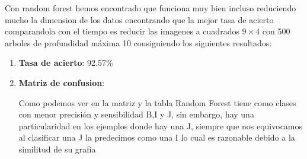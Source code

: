 \documentclass[8pt,a4paper]{{esannV2}}
\begin{document}
Con random forest hemos encontrado que funciona muy bien incluso reduciendo mucho la dimension de los datos encontrando que la mejor tasa de acierto comparandola con el tiempo es reducir las imagenes a cuadrados $9\times4$ con 500 arboles de profundidad máxima 10 consiguiendo los siguientes resultados:
\begin{enumerate}
\item \textbf{Tasa de acierto}: 92.57$\%$
\item \textbf{Matriz de confusion}:

Como podemos ver en la matriz y la tabla Random Forest tiene como clases con menor precisión y sensibilidad B,I y J, sin embargo, hay una particularidad en los ejemplos donde hay una J, siempre que nos equivocamos al clasificar una J la predecimos como una I lo cual es razonable debido a la similitud de su grafía


\end{enumerate}
\end{document}
